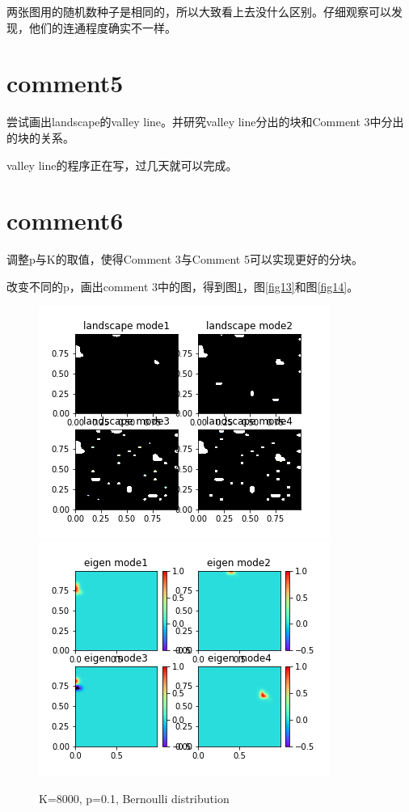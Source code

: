 \documentclass[UTF8,12pt]{article}
\begin{document}
两张图用的随机数种子是相同的，所以大致看上去没什么区别。仔细观察可以发现，他们的连通程度确实不一样。

\section{comment5}

尝试画出landscape的valley line。并研究valley line分出的块和Comment 3中分出的块的关系。

valley line的程序正在写，过几天就可以完成。

\section{comment6}

调整p与K的取值，使得Comment 3与Comment 5可以实现更好的分块。

改变不同的p，画出comment 3中的图，得到图\ref{fig12}，图\ref{fig13}和图\ref{fig14}。

\begin{figure}[htbp]
    \centering
    \includegraphics[width=0.45\linewidth]{../pics/wm12}
    \includegraphics[width=0.45\linewidth]{../pics/u12}
    \caption{K=8000, p=0.1, Bernoulli distribution}
    \label{fig12}
\end{figure}
\end{document}
